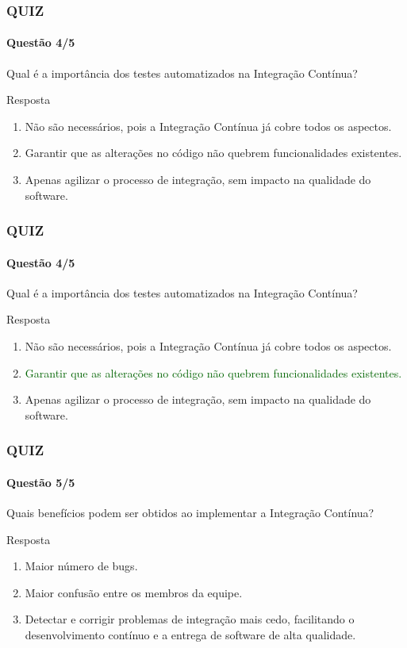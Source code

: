 \documentclass[
	9pt, %
	t, %
]{beamer}
\begin{document}
\begin{frame}
	\frametitle{QUIZ}
	\framesubtitle{Questão 4/5}

	{\Large Qual é a importância dos testes automatizados na Integração Contínua? }

	\begin{exampleblock}{Resposta}
		\begin{enumerate}[a]
			\item Não são necessários, pois a Integração Contínua já cobre todos os aspectos.
			\item Garantir que as alterações no código não quebrem funcionalidades existentes.
			\item Apenas agilizar o processo de integração, sem impacto na qualidade do software.
		\end{enumerate}
	\end{exampleblock}

\end{frame}

\begin{frame}
	\frametitle{QUIZ}
	\framesubtitle{Questão 4/5}

	{\Large Qual é a importância dos testes automatizados na Integração Contínua? }

	\begin{exampleblock}{Resposta}
		\begin{enumerate}[a]
			\item Não são necessários, pois a Integração Contínua já cobre todos os aspectos.
			\item \textcolor{darkgreen}{Garantir que as alterações no código não quebrem funcionalidades existentes.}
			\item Apenas agilizar o processo de integração, sem impacto na qualidade do software.
		\end{enumerate}
	\end{exampleblock}

\end{frame}

\begin{frame}
	\frametitle{QUIZ}
	\framesubtitle{Questão 5/5}

	{\Large Quais benefícios podem ser obtidos ao implementar a Integração Contínua? }

	\begin{exampleblock}{Resposta}
		\begin{enumerate}[a]
			\item Maior número de bugs.
			\item Maior confusão entre os membros da equipe.
			\item Detectar e corrigir problemas de integração mais cedo, facilitando o desenvolvimento contínuo e a entrega de software de alta qualidade.
		\end{enumerate}
	\end{exampleblock}

\end{frame}
\end{document}
